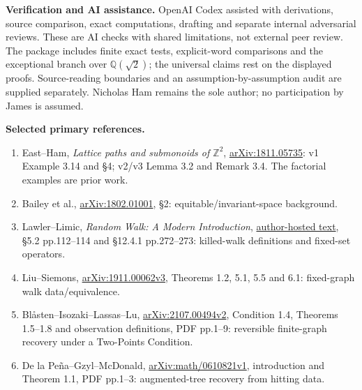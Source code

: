 \documentclass[10pt]{article}
\newcommand{\Z}{\mathbb Z}
\begin{document}
\textbf{Verification and AI assistance.} OpenAI Codex assisted with derivations, source comparison, exact computations, drafting and separate internal adversarial reviews. These are AI checks with shared limitations, not external peer review. The package includes finite exact tests, explicit-word comparisons and the exceptional branch over $\mathbb Q(\sqrt2)$; the universal claims rest on the displayed proofs. Source-reading boundaries and an assumption-by-assumption audit are supplied separately. Nicholas Ham remains the sole author; no participation by James is assumed.

\textbf{Selected primary references.}
\begin{enumerate}
\item East--Ham, \emph{Lattice paths and submonoids of $\Z^2$}, \href{https://arxiv.org/abs/1811.05735}{arXiv:1811.05735}: v1 Example 3.14 and \S4; v2/v3 Lemma 3.2 and Remark 3.4. The factorial examples are prior work.
\item Bailey et al., \href{https://arxiv.org/abs/1802.01001}{arXiv:1802.01001}, \S2: equitable/invariant-space background.
\item Lawler--Limic, \emph{Random Walk: A Modern Introduction}, \href{https://www.math.uchicago.edu/~lawler/srwbook.pdf}{author-hosted text}, \S5.2 pp.112--114 and \S12.4.1 pp.272--273: killed-walk definitions and fixed-set operators.
\item Liu--Siemons, \href{https://arxiv.org/abs/1911.00062v3}{arXiv:1911.00062v3}, Theorems 1.2, 5.1, 5.5 and 6.1: fixed-graph walk data/equivalence.
\item Bl{\aa}sten--Isozaki--Lassas--Lu, \href{https://arxiv.org/abs/2107.00494v2}{arXiv:2107.00494v2}, Condition 1.4, Theorems 1.5--1.8 and observation definitions, PDF pp.1--9: reversible finite-graph recovery under a Two-Points Condition.
\item De la Pe{\~n}a--Gzyl--McDonald, \href{https://arxiv.org/abs/math/0610821v1}{arXiv:math/0610821v1}, introduction and Theorem 1.1, PDF pp.1--3: augmented-tree recovery from hitting data.
\end{enumerate}
\end{document}
